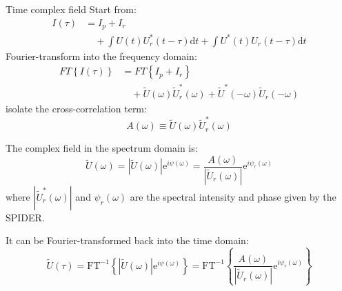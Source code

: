 \documentclass[11pt]{beamer}
\begin{document}
\begin{frame}{Time complex field}
Start from:
\begin{align}
	I(\tau) 	&= I_p + I_r \nonumber\\
			&\quad+ \int U(t)U_r^*(t-\tau)\mathrm{d}t + \int U^*(t)U_r(t-\tau)\mathrm{d}t 
	\label{eq_inter}
\end{align}
Fourier-transform into the frequency domain:
\begin{align}
FT\left\lbrace I(\tau)\right\rbrace 	&= 	FT\left\lbrace I_p + I_r \right\rbrace \nonumber\\
&\quad+ \tilde{U}(\omega)\tilde{U}_r^*(\omega) + \tilde{U}^*(-\omega)\tilde{U}_r(-\omega)
	\label{eq_fourier}
\end{align}
isolate the cross-correlation term:
\begin{equation*}
A(\omega) \equiv \tilde{U}(\omega)\tilde{U}_r^*(\omega)
\end{equation*}

\end{frame}
\begin{frame}
The complex field in the spectrum domain is:
\begin{equation}
\tilde{U}(\omega) = |\tilde{U}(\omega)|\mathrm{e}^{i\psi(\omega)} = \frac{A(\omega)}{|\tilde{U}_r(\omega)|}\mathrm{e}^{i\psi_r(\omega)}
	\label{eq_field_spectral}
\end{equation}
where $|\tilde{U}_r^*(\omega)|$ and $\psi_r(\omega)$ are the spectral intensity and phase given by the SPIDER.

\vspace{15pt}
It can be Fourier-transformed back into the time domain:
\begin{equation}
\tilde{U}(\tau) = \mathrm{FT}^{-1} \left\lbrace |\tilde{U}(\omega)|\mathrm{e}^{i\psi(\omega)} \right\rbrace
= \mathrm{FT}^{-1} \left\lbrace \frac{A(\omega)}{|\tilde{U}_r(\omega)|}\mathrm{e}^{i\psi_r(\omega)} \right\rbrace
	\label{eq_field}
\end{equation}
\end{frame}
\end{document}
